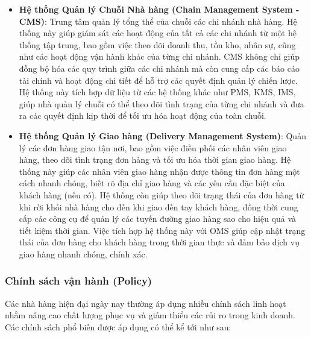 \begin{itemize}
	\item \textbf{Hệ thống Quản lý Chuỗi Nhà hàng (Chain Management System - CMS)}: Trung tâm quản lý tổng thể của chuỗi các chi nhánh nhà hàng. Hệ thống này giúp giám sát các hoạt động của tất cả các chi nhánh từ một hệ thống tập trung, bao gồm việc theo dõi doanh thu, tồn kho, nhân sự, cũng như các hoạt động vận hành khác của từng chi nhánh. CMS không chỉ giúp đồng bộ hóa các quy trình giữa các chi nhánh mà còn cung cấp các báo cáo tài chính và hoạt động chi tiết để hỗ trợ các quyết định quản lý chiến lược. Hệ thống này tích hợp dữ liệu từ các hệ thống khác như PMS, KMS, IMS, giúp nhà quản lý chuỗi có thể theo dõi tình trạng của từng chi nhánh và đưa ra các quyết định kịp thời để tối ưu hóa hoạt động của toàn chuỗi.

	\item \textbf{Hệ thống Quản lý Giao hàng (Delivery Management System)}: Quản lý các đơn hàng giao tận nơi, bao gồm việc điều phối các nhân viên giao hàng, theo dõi tình trạng đơn hàng và tối ưu hóa thời gian giao hàng. Hệ thống này giúp các nhân viên giao hàng nhận được thông tin đơn hàng một cách nhanh chóng, biết rõ địa chỉ giao hàng và các yêu cầu đặc biệt của khách hàng (nếu có). Hệ thống còn giúp theo dõi trạng thái của đơn hàng từ khi rời khỏi nhà hàng cho đến khi giao đến tay khách hàng, đồng thời cung cấp các công cụ để quản lý các tuyến đường giao hàng sao cho hiệu quả và tiết kiệm thời gian. Việc tích hợp hệ thống này với OMS giúp cập nhật trạng thái của đơn hàng cho khách hàng trong thời gian thực và đảm bảo dịch vụ giao hàng nhanh chóng, chính xác.
\end{itemize}

\subsubsection{Chính sách vận hành (Policy)}
Các nhà hàng hiện đại ngày nay thường áp dụng nhiều chính sách linh hoạt nhằm nâng cao chất lượng phục vụ và giảm thiểu các rủi ro trong kinh doanh. Các chính sách phổ biến được áp dụng có thể kể tới như sau:

